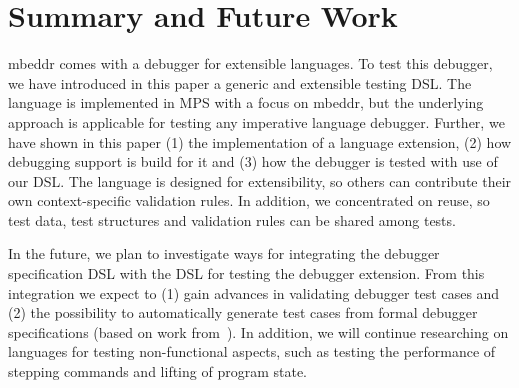\section{Summary and Future Work}

mbeddr comes with a debugger for extensible languages.
To test this debugger, we have introduced in this paper a generic and extensible
testing \ac{DSL}.
The language is implemented in \ac{MPS} with a focus on mbeddr, but the
underlying approach is applicable for testing any imperative language debugger. Further, we
have shown in this paper (1) the implementation of a language extension, (2) how
debugging support is build for it and (3) how the debugger is tested with use of
our \ac{DSL}. The language is designed for extensibility, so others can contribute
their own context-specific validation rules. In addition, we concentrated on
reuse, so test data, test structures and validation rules can be shared among
tests.

In the future, we plan to investigate ways for integrating the debugger
specification \ac{DSL} with the \ac{DSL} for testing the debugger extension. From this
integration we expect to (1) gain advances in validating debugger test cases and
(2) the possibility to automatically generate test cases from formal debugger
specifications (based on work from~\cite{conf/kbse/WuG05,henriques05}). 
In addition, we will continue
researching on languages for testing non-functional aspects, such as testing the
performance of stepping commands and lifting of program state.